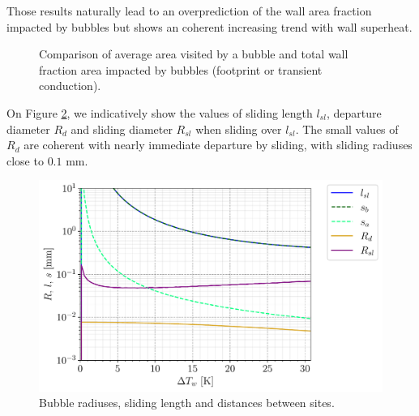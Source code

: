 \npar

Those results naturally lead to an overprediction of the wall area fraction impacted by bubbles but shows an coherent increasing trend with wall superheat.

\npar 



\begin{figure}[!h]
\caption{Comparison of average area visited by a bubble and total wall fraction area impacted by bubbles (footprint or transient conduction).}
\label{fig:fullkoss_area}
\end{figure}

\npar

On Figure \ref{fig:fullkoss_length}, we indicatively show the values of sliding length $l_{sl}$, departure diameter $R_{d}$ and sliding diameter $R_{sl}$ when sliding over $l_{sl}$. The small values of $R_{d}$ are coherent with nearly immediate departure by sliding, with sliding radiuses close to $0.1$ mm.


\begin{figure}[!h]
\centering
\includegraphics[width=0.65\linewidth]{img/HFP/fullcomp_Koss/length_G2000.pdf}
\caption{Bubble radiuses, sliding length and distances between sites.}
\label{fig:fullkoss_length}
\end{figure}



